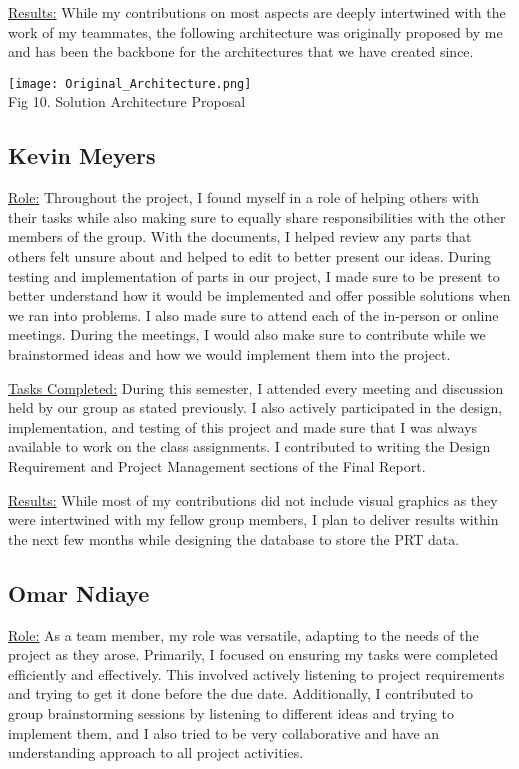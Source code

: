 \underline{Results:} While my contributions on most aspects are deeply intertwined with the work of my teammates, the following architecture was originally proposed by me and has been the backbone for the architectures that we have created since.

\begin{center}
    \texttt{[image: Original\_Architecture.png]}\\
    Fig 10. Solution Architecture Proposal
\end{center}

\subsection{Kevin Meyers}
\underline{Role:} Throughout the project, I found myself in a role of helping others with their tasks while also making sure to equally share responsibilities with the other members of the group. 
With the documents, I helped review any parts that others felt unsure about and helped to edit to better present our ideas. 
During testing and implementation of parts in our project, I made sure to be present to better understand how it would be implemented and offer possible solutions when we ran into problems. 
I also made sure to attend each of the in-person or online meetings. 
During the meetings, I would also make sure to contribute while we brainstormed ideas and how we would implement them into the project.

\underline{Tasks Completed:} During this semester, I attended every meeting and discussion held by our group as stated previously. 
I also actively participated in the design, implementation, and testing of this project and made sure that I was always available to work on the class assignments. 
I contributed to writing the Design Requirement and Project Management sections of the Final Report.

\underline{Results:} While most of my contributions did not include visual graphics as they were intertwined with my fellow group members, I plan to deliver results within the next few months while designing the database to store the PRT data.

\subsection{Omar Ndiaye}
\underline{Role:} As a team member, my role was versatile, adapting to the needs of the project as they arose. 
Primarily, I focused on ensuring my tasks were completed efficiently and effectively. 
This involved actively listening to project requirements and trying to get it done before the due date. 
Additionally, I contributed to group brainstorming sessions by listening to different ideas and trying to implement them, and I also tried to be very collaborative and have an understanding approach to all project activities.

